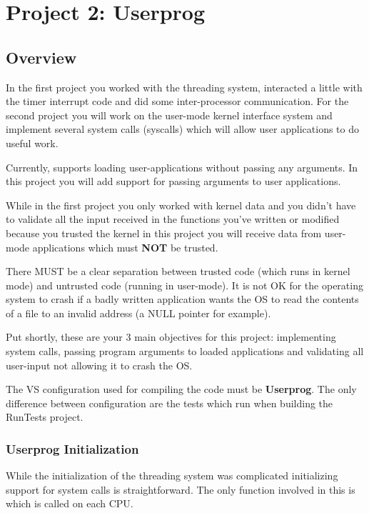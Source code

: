 \chapter{Project 2: Userprog}

\section{Overview}

In the first project you worked with the threading system, interacted a little with the timer
interrupt code and did some inter-processor communication. For the second project you will work on
the user-mode kernel interface system and implement several system calls (syscalls) which will
allow user applications to do useful work.

Currently, \projectname supports loading user-applications without passing any arguments. In this
project you will add support for passing arguments to user applications.

While in the first project you only worked with kernel data and you didn't have to validate all the
input received in the functions you've written or modified because you trusted the kernel in this
project you will receive data from user-mode applications which must \textbf{NOT} be trusted.

There MUST be a clear separation between trusted code (which runs in kernel mode) and untrusted code
(running in user-mode). It is not OK for the operating system to crash if a badly written
application wants the OS to read the contents of a file to an invalid address (a NULL pointer for
example).

Put shortly, these are your 3 main objectives for this project: implementing system calls, passing
program arguments to loaded applications and validating all user-input not allowing it to crash the
OS.

The VS configuration used for compiling the code must be \textbf{Userprog}. The only difference
between configuration are the tests which run when building the RunTests project.

\subsection{Userprog Initialization}

While the initialization of the threading system was complicated initializing support for system
calls is straightforward. The only function involved in this is  which is
called on each CPU.

